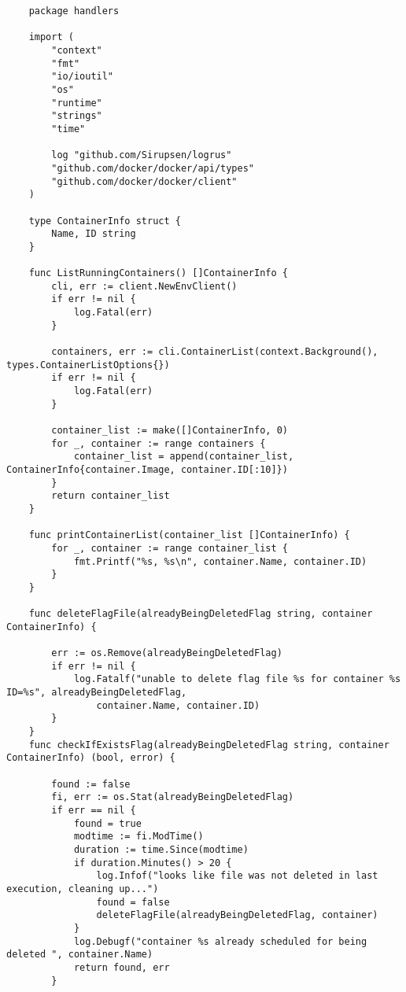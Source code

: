 \begin{verbatim}
    package handlers
    
    import (
        "context"
        "fmt"
        "io/ioutil"
        "os"
        "runtime"
        "strings"
        "time"
    
        log "github.com/Sirupsen/logrus"
        "github.com/docker/docker/api/types"
        "github.com/docker/docker/client"
    )
    
    type ContainerInfo struct {
        Name, ID string
    }
    
    func ListRunningContainers() []ContainerInfo {
        cli, err := client.NewEnvClient()
        if err != nil {
            log.Fatal(err)
        }
    
        containers, err := cli.ContainerList(context.Background(), types.ContainerListOptions{})
        if err != nil {
            log.Fatal(err)
        }
    
        container_list := make([]ContainerInfo, 0)
        for _, container := range containers {
            container_list = append(container_list, ContainerInfo{container.Image, container.ID[:10]})
        }
        return container_list
    }
    
    func printContainerList(container_list []ContainerInfo) {
        for _, container := range container_list {
            fmt.Printf("%s, %s\n", container.Name, container.ID)
        }
    }
    
    func deleteFlagFile(alreadyBeingDeletedFlag string, container ContainerInfo) {
    
        err := os.Remove(alreadyBeingDeletedFlag)
        if err != nil {
            log.Fatalf("unable to delete flag file %s for container %s ID=%s", alreadyBeingDeletedFlag,
                container.Name, container.ID)
        }
    }
    func checkIfExistsFlag(alreadyBeingDeletedFlag string, container ContainerInfo) (bool, error) {
    
        found := false
        fi, err := os.Stat(alreadyBeingDeletedFlag)
        if err == nil {
            found = true
            modtime := fi.ModTime()
            duration := time.Since(modtime)
            if duration.Minutes() > 20 {
                log.Infof("looks like file was not deleted in last execution, cleaning up...")
                found = false
                deleteFlagFile(alreadyBeingDeletedFlag, container)
            }
            log.Debugf("container %s already scheduled for being deleted ", container.Name)
            return found, err
        }
    

\end{verbatim}
